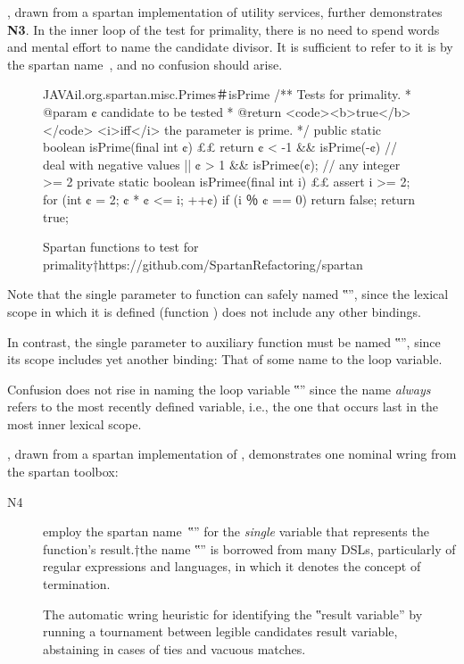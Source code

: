 , drawn from a spartan implementation of
utility services,
  further demonstrates \textbf{N3}. In the inner loop of the test for
  primality, there is no need to spend words and mental effort to name the
  candidate divisor. It is sufficient to refer to it is by the spartan
  name~, and no confusion should arise.

\begin{figure}
\caption{\label{figure:primality}
  Spartan functions to test for primality†{https://github.com/SpartanRefactoring/spartan}
 }
\begin{Code}{JAVA}{il.org.spartan.misc.Primes＃isPrime}
/** Tests for primality.
  * @param ¢ candidate to be tested
  * @return <code><b>true</b></code> <i>iff</i> the parameter is prime. */
public static boolean isPrime(final int ¢) {££
  return ¢ < -1 && isPrime(-¢) // deal with negative values
      || ¢ > 1 && isPrime¢(¢); // any integer >= 2
}
private static boolean isPrime¢(final int i) {££
  assert i >= 2;
  for (int ¢ = 2; ¢ * ¢ <= i; ++¢)
    if (i ％ ¢ == 0)
      return false;
  return true;
}
\end{Code}
\end{figure}

Note that the single parameter to function  can safely named
‟”, since the lexical scope in which it is defined (function
) does not include any other bindings.

In contrast, the single parameter to auxiliary  function
 must be named ‟”, since its scope includes yet another
binding: That of some name to the loop variable.

Confusion does not rise in naming the loop variable ‟” since the name
\emph{always} refers to the most recently defined variable, i.e., the one that
occurs last in the most inner lexical scope.

, drawn from a spartan implementation of
\Prolog{}, demonstrates one nominal wring 
from the spartan toolbox: 
\begin{description}
\item[N4] employ the spartan name~‟\cc{\$}” for
  the \emph{single} variable that represents the function's result.†{the name
    ‟\cc{\$}” is borrowed from many DSLs, particularly of regular expressions
    and languages, in which it denotes the concept of termination.}

  The automatic wring heuristic for identifying the ‟result variable”
  by running a tournament between legible candidates result variable,
  abstaining in cases of ties and vacuous matches.
\end{description}

